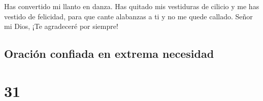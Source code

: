  Has convertido mi llanto en danza. Has quitado mis
vestiduras de cilicio y me has vestido de felicidad,  para
que cante alabanzas a ti y no me quede callado. Señor mi Dios, ¡Te
agradeceré por siempre!

\hypertarget{oraciuxf3n-confiada-en-extrema-necesidad}{%
\subsection{Oración confiada en extrema
necesidad}\label{oraciuxf3n-confiada-en-extrema-necesidad}}

\hypertarget{section-30}{%
\section{31}\label{section-30}}

